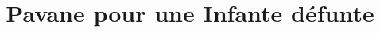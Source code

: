 \documentclass{article}         %
\begin{document}


\def\interscoreline{\vskip12pt}
\title{Pavane pour une Infante d\'efunte}
\maketit

\end{document}
